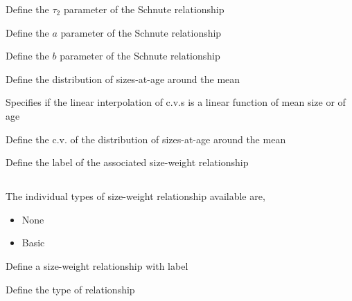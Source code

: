  {Define the $\tau_2$ parameter of the Schnute relationship}

 {Define the $a$ parameter of the Schnute relationship}

 {Define the $b$ parameter of the Schnute relationship}

 {Define the distribution of sizes-at-age around the mean}

 {Specifies if the linear interpolation of c.v.s is a linear function of mean size or of age}

 {Define the c.v. of the distribution of sizes-at-age around the mean}

 {Define the label of the associated size-weight relationship}

\subsection{}

The individual types of size-weight relationship available are,

\begin{itemize}
	\item None
	\item Basic
\end{itemize}

 {Define a size-weight relationship with label}

 {Define the type of relationship}

\subsubsection[None]{}

